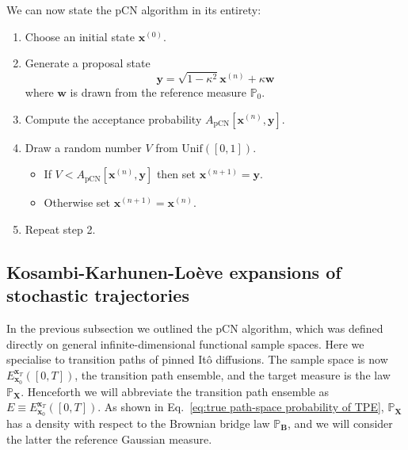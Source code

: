 We can now state the pCN algorithm in its entirety:
\begin{enumerate}
\item Choose an initial state $\mathbf{x}^{(0)}$.

\item Generate a proposal state
	\begin{equation} \label{eq:pCN update rule}
		\mathbf{y} = \sqrt{1 - \kappa^2} \mathbf{x}^{(n)} + \kappa \mathbf{w}
	\end{equation}
	where $\mathbf{w}$ is drawn from the reference measure $\mathbb{P}_0$.
	
\item Compute the acceptance probability $A_\text{pCN}[\mathbf{x}^{(n)}, \mathbf{y}]$.
	
\item Draw a random number $V$ from $\text{Unif}([0,1])$.
	\begin{itemize}
		\item If $V < A_\text{pCN}[\mathbf{x}^{(n)}, \mathbf{y}]$ then set $\mathbf{x}^{(n+1)} = \mathbf{y}$.
		\item Otherwise set $\mathbf{x}^{(n+1)} = \mathbf{x}^{(n)}$.
	\end{itemize}
	
\item Repeat step 2.
\end{enumerate}

\subsection{Kosambi-Karhunen-Lo\`eve expansions of stochastic trajectories} \label{sec:Kosambi-Karhunen-Loeve expansions of stochastic trajectories}
 
In the previous subsection we outlined the pCN algorithm, which was defined directly on general infinite-dimensional functional sample spaces. Here we specialise to transition paths of pinned It\^{o} diffusions. The sample space is now $E_{\mathbf{x}_0}^{\mathbf{x}_T}([0,T])$, the transition path ensemble, and the target measure is the law $\mathbb{P}_\mathbf{X}$. Henceforth we will abbreviate the transition path ensemble as $E \equiv E_{\mathbf{x}_0}^{\mathbf{x}_T}([0,T])$. As shown in Eq.~\ref{eq:true path-space probability of TPE}, $\mathbb{P}_\mathbf{X}$ has a density with respect to the Brownian bridge law $\mathbb{P}_\mathbf{B}$, and we will consider the latter the reference Gaussian measure.

